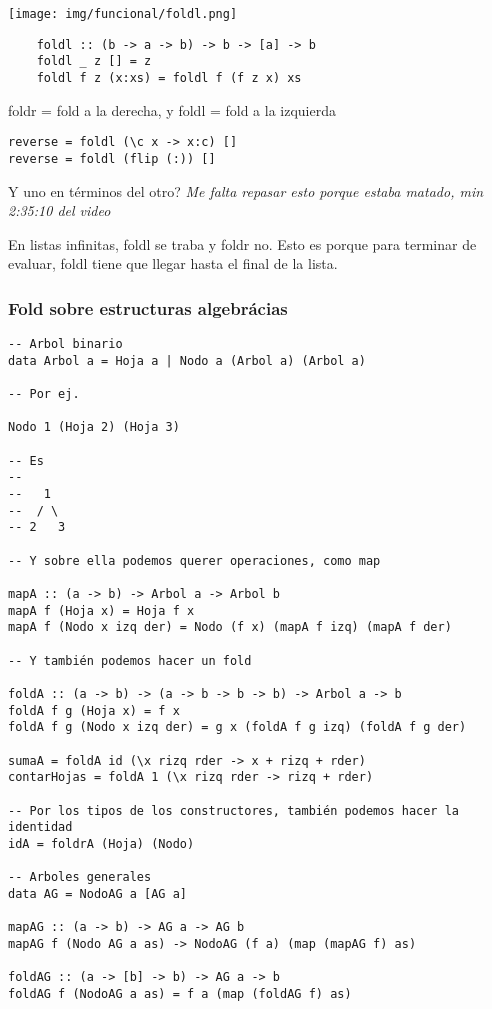 \documentclass{report}
\theoremstyle{definition} %
\begin{document}
\begin{center}
    \texttt{[image: img/funcional/foldl.png]}
\end{center}

\begin{verbatim}
    foldl :: (b -> a -> b) -> b -> [a] -> b
    foldl _ z [] = z
    foldl f z (x:xs) = foldl f (f z x) xs
\end{verbatim}

foldr = fold a la derecha, y foldl = fold a la izquierda

\begin{verbatim}
reverse = foldl (\c x -> x:c) []
reverse = foldl (flip (:)) []
\end{verbatim}

Y uno en términos del otro? \textit{Me falta repasar esto porque estaba matado,
min 2:35:10 del video}

En listas infinitas, foldl se traba y foldr no. Esto es porque para terminar de
evaluar, foldl tiene que llegar hasta el final de la lista.

\subsubsection{Fold sobre estructuras algebrácias}

\begin{verbatim}
-- Arbol binario
data Arbol a = Hoja a | Nodo a (Arbol a) (Arbol a)

-- Por ej.

Nodo 1 (Hoja 2) (Hoja 3)

-- Es
--
--   1
--  / \
-- 2   3

-- Y sobre ella podemos querer operaciones, como map

mapA :: (a -> b) -> Arbol a -> Arbol b
mapA f (Hoja x) = Hoja f x
mapA f (Nodo x izq der) = Nodo (f x) (mapA f izq) (mapA f der)

-- Y también podemos hacer un fold

foldA :: (a -> b) -> (a -> b -> b -> b) -> Arbol a -> b
foldA f g (Hoja x) = f x
foldA f g (Nodo x izq der) = g x (foldA f g izq) (foldA f g der)

sumaA = foldA id (\x rizq rder -> x + rizq + rder)
contarHojas = foldA 1 (\x rizq rder -> rizq + rder)

-- Por los tipos de los constructores, también podemos hacer la identidad
idA = foldrA (Hoja) (Nodo)

-- Arboles generales
data AG = NodoAG a [AG a]

mapAG :: (a -> b) -> AG a -> AG b
mapAG f (Nodo AG a as) -> NodoAG (f a) (map (mapAG f) as)

foldAG :: (a -> [b] -> b) -> AG a -> b
foldAG f (NodoAG a as) = f a (map (foldAG f) as)
\end{verbatim}
\end{document}
